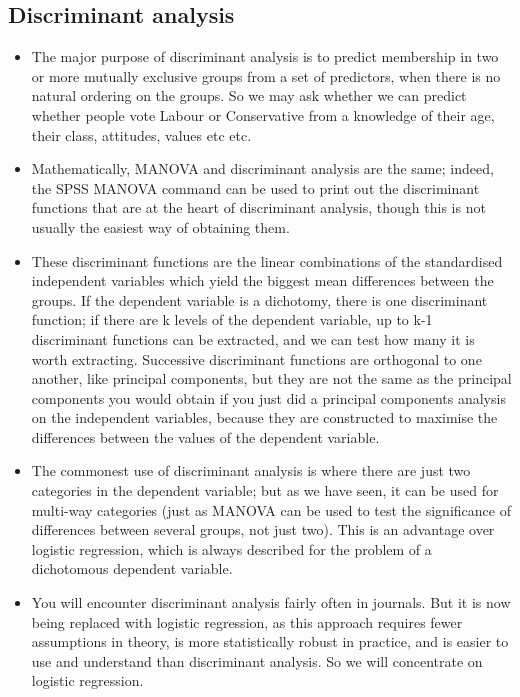 \subsection{Discriminant analysis}
\begin{itemize}

\item The major purpose of discriminant analysis is to predict membership in two or more mutually exclusive groups from a set of predictors, when there is no natural ordering on the groups. So we may ask whether we can predict whether people vote Labour or Conservative from a knowledge of their age, their class, attitudes, values etc etc.



\item Mathematically, MANOVA and discriminant analysis are the same; indeed, the SPSS MANOVA command can be used to print out the discriminant functions that are at the heart of discriminant analysis, though this is not usually the easiest way of obtaining them. 
\item These discriminant functions are the linear combinations of the standardised independent variables which yield the biggest mean differences between the groups. If the dependent variable is a dichotomy, there is one discriminant function; if there are k levels of the dependent variable, up to k-1 discriminant functions can be extracted, and we can test how many it is worth extracting. Successive discriminant functions are orthogonal to one another, like principal components, but they are not the same as the principal components you would obtain if you just did a principal components analysis on the independent variables, because they are constructed to maximise the differences between the values of the dependent variable.

\item The commonest use of discriminant analysis is where there are just two categories in the dependent variable; but as we have seen, it can be used for multi-way categories (just as MANOVA can be used to test the significance of differences between several groups, not just two). This is an advantage over logistic regression, which is always described for the problem of a dichotomous dependent variable.

\item You will encounter discriminant analysis fairly often in journals. But it is now being replaced with logistic regression, as this approach requires fewer assumptions in theory, is more statistically robust in practice, and is easier to use and understand than discriminant analysis. So we will concentrate on logistic regression.
\end{itemize}



